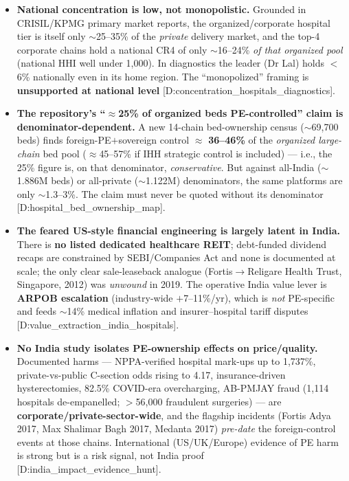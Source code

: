 \documentclass[11pt,a4paper]{article}
\newcommand{\cs}[1]{\textnormal{[#1]}}
\begin{document}
\begin{itemize}[leftmargin=1.4em,itemsep=4pt]
\item \textbf{National concentration is low, not monopolistic.} Grounded in CRISIL/KPMG primary market reports, the organized/corporate hospital tier is itself only $\sim$25--35\% of the \emph{private} delivery market, and the top-4 corporate chains hold a national CR4 of only $\sim$16--24\% \emph{of that organized pool} (national HHI well under 1{,}000). In diagnostics the leader (Dr Lal) holds $<$6\% nationally even in its home region. The ``monopolized'' framing is \textbf{unsupported at national level} \cs{D:concentration\_hospitals\_diagnostics}.

\item \textbf{The repository's ``$\approx$25\% of organized beds PE-controlled'' claim is denominator-dependent.} A new 14-chain bed-ownership census ($\sim$69{,}700 beds) finds foreign-PE$+$sovereign control $\approx$ \textbf{36--46\%} of the \emph{organized large-chain} bed pool ($\approx$45--57\% if IHH strategic control is included) --- i.e., the 25\% figure is, on that denominator, \emph{conservative}. But against all-India ($\sim$1.886M beds) or all-private ($\sim$1.122M) denominators, the same platforms are only $\sim$1.3--3\%. The claim must never be quoted without its denominator \cs{D:hospital\_bed\_ownership\_map}.

\item \textbf{The feared US-style financial engineering is largely latent in India.} There is \textbf{no listed dedicated healthcare REIT}; debt-funded dividend recaps are constrained by SEBI/Companies Act and none is documented at scale; the only clear sale-leaseback analogue (Fortis$\rightarrow$Religare Health Trust, Singapore, 2012) was \emph{unwound} in 2019. The operative India value lever is \textbf{ARPOB escalation} (industry-wide $+$7--11\%/yr), which is \emph{not} PE-specific and feeds $\sim$14\% medical inflation and insurer--hospital tariff disputes \cs{D:value\_extraction\_india\_hospitals}.

\item \textbf{No India study isolates PE-ownership effects on price/quality.} Documented harms --- NPPA-verified hospital mark-ups up to 1{,}737\%, private-vs-public C-section odds rising to 4.17, insurance-driven hysterectomies, 82.5\% COVID-era overcharging, AB-PMJAY fraud (1{,}114 hospitals de-empanelled; $>$56{,}000 fraudulent surgeries) --- are \textbf{corporate/private-sector-wide}, and the flagship incidents (Fortis Adya 2017, Max Shalimar Bagh 2017, Medanta 2017) \emph{pre-date} the foreign-control events at those chains. International (US/UK/Europe) evidence of PE harm is strong but is a risk signal, not India proof \cs{D:india\_impact\_evidence\_hunt}.


\end{itemize}
\end{document}
